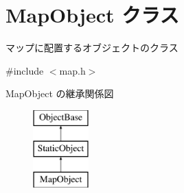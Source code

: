 \hypertarget{class_map_object}{}\section{Map\+Object クラス}
\label{class_map_object}


マップに配置するオブジェクトのクラス  




{\ttfamily \#include $<$map.\+h$>$}

Map\+Object の継承関係図\begin{figure}[H]
\begin{center}
\leavevmode
\includegraphics[height=3.000000cm]{class_map_object}
\end{center}
\end{figure}
